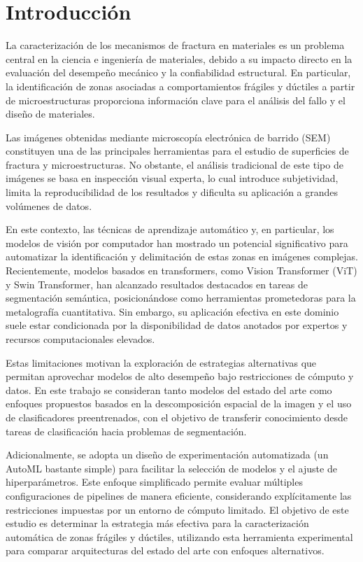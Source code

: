 \documentclass[onecolumn, 12pt , journal]{IEEEtran}
\begin{document}
\section{Introducción}
La caracterización de los mecanismos de fractura en materiales es un problema central en la ciencia e ingeniería de materiales, debido a su impacto directo en la evaluación del desempeño mecánico y la confiabilidad estructural. En particular, la identificación de zonas asociadas a comportamientos frágiles y dúctiles a partir de microestructuras proporciona información clave para el análisis del fallo y el diseño de materiales.

Las imágenes obtenidas mediante microscopía electrónica de barrido (SEM) constituyen una de las principales herramientas para el estudio de superficies de fractura y microestructuras. No obstante, el análisis tradicional de este tipo de imágenes se basa en inspección visual experta, lo cual introduce subjetividad, limita la reproducibilidad de los resultados y dificulta su aplicación a grandes volúmenes de datos.

En este contexto, las técnicas de aprendizaje automático y, en particular, los modelos de visión por computador han mostrado un potencial significativo para automatizar la identificación y delimitación de estas zonas en imágenes complejas. Recientemente, modelos basados en transformers, como Vision Transformer (ViT) y Swin Transformer, han alcanzado resultados destacados en tareas de segmentación semántica, posicionándose como herramientas prometedoras para la metalografía cuantitativa. Sin embargo, su aplicación efectiva en este dominio suele estar condicionada por la disponibilidad de datos anotados por expertos y recursos computacionales elevados.

Estas limitaciones motivan la exploración de estrategias alternativas que permitan aprovechar modelos de alto desempeño bajo restricciones de cómputo y datos. En este trabajo se consideran tanto modelos del estado del arte como enfoques propuestos basados en la descomposición espacial de la imagen y el uso de clasificadores preentrenados, con el objetivo de transferir conocimiento desde tareas de clasificación hacia problemas de segmentación.

Adicionalmente, se adopta un diseño de experimentación automatizada (un AutoML bastante simple) para facilitar la selección de modelos y el ajuste de hiperparámetros. Este enfoque simplificado permite evaluar múltiples configuraciones de pipelines de manera eficiente, considerando explícitamente las restricciones impuestas por un entorno de cómputo limitado. El objetivo de este estudio es determinar la estrategia más efectiva para la caracterización automática de zonas frágiles y dúctiles, utilizando esta herramienta experimental para comparar arquitecturas del estado del arte con enfoques alternativos.
\end{document}
